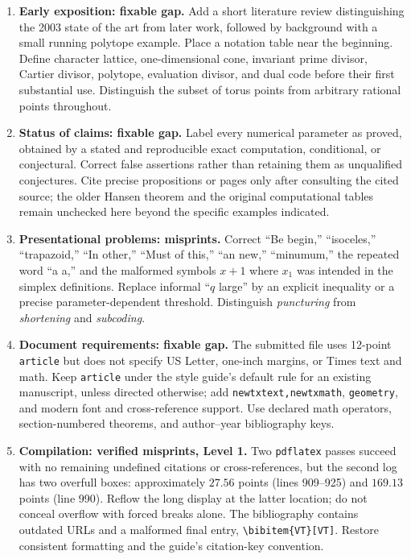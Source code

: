 \documentclass[12pt,letterpaper]{article}
\newcommand{\level}[1]{\textsf{Level #1}}
\begin{document}
\begin{enumerate}[label=\textbf{S\arabic*.},leftmargin=*]
\item \textbf{Early exposition: fixable gap.}  Add a short literature review distinguishing the 2003 state of the art from later work, followed by background with a small running polytope example.  Place a notation table near the beginning.  Define character lattice, one-dimensional cone, invariant prime divisor, Cartier divisor, polytope, evaluation divisor, and dual code before their first substantial use.  Distinguish the subset of torus points from arbitrary rational points throughout.
\item \textbf{Status of claims: fixable gap.}  Label every numerical parameter as proved, obtained by a stated and reproducible exact computation, conditional, or conjectural.  Correct false assertions rather than retaining them as unqualified conjectures.  Cite precise propositions or pages only after consulting the cited source; the older Hansen theorem and the original computational tables remain unchecked here beyond the specific examples indicated.
\item \textbf{Presentational problems: misprints.}  Correct ``Be begin,'' ``isoceles,'' ``trapazoid,'' ``In other,'' ``Must of this,'' ``an new,'' ``minumum,'' the repeated word ``a a,'' and the malformed symbols $x+1$ where $x_1$ was intended in the simplex definitions.  Replace informal ``$q$ large'' by an explicit inequality or a precise parameter-dependent threshold.  Distinguish \emph{puncturing} from \emph{shortening} and \emph{subcoding}.
\item \textbf{Document requirements: fixable gap.}  The submitted file uses 12-point \texttt{article} but does not specify US Letter, one-inch margins, or Times text and math.  Keep \texttt{article} under the style guide's default rule for an existing manuscript, unless directed otherwise; add \texttt{newtxtext,newtxmath}, \texttt{geometry}, and modern font and cross-reference support.  Use declared math operators, section-numbered theorems, and author--year bibliography keys.
\item \textbf{Compilation: verified misprints, \level{1}.}  Two \texttt{pdflatex} passes succeed with no remaining undefined citations or cross-references, but the second log has two overfull boxes: approximately $27.56$ points (lines 909--925) and $169.13$ points (line 990).  Reflow the long display at the latter location; do not conceal overflow with forced breaks alone.  The bibliography contains outdated URLs and a malformed final entry, \verb|\bibitem{VT}[VT]|.  Restore consistent formatting and the guide's citation-key convention.

\end{enumerate}
\end{document}
